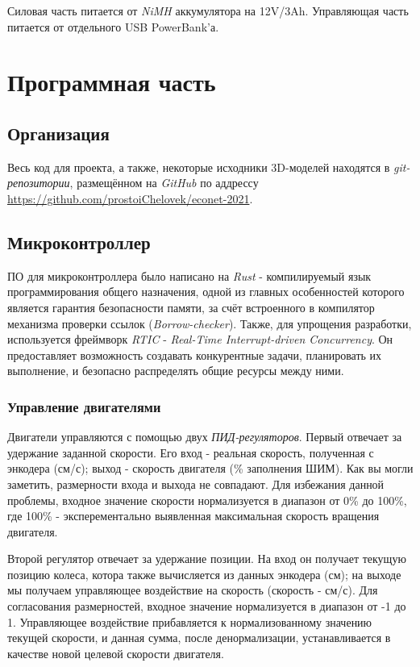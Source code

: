 \documentclass[11pt]{article}
\let\oldsection\section
\renewcommand\section{\pagebreak\oldsection}
\begin{document}
Силовая часть питается от \emph{NiMH} аккумулятора на 12V/3Ah. Управляющая часть питается от отдельного USB PowerBank'а.
\section{Программная часть}
\label{sec:org651214d}
\subsection{Организация}
\label{sec:org846646d}
Весь код для проекта, а также, некоторые исходники 3D-моделей находятся в \emph{git-репозитории}, размещённом на \emph{GitHub} по аддрессу \url{https://github.com/prostoiChelovek/econet-2021}.
\subsection{Микроконтроллер}
\label{sec:orgae6d461}
ПО для микроконтроллера было написано на \emph{Rust} - компилируемый язык программирования общего назначения, одной из главных особенностей которого является гарантия безопасности памяти, за счёт встроенного в компилятор механизма проверки ссылок (\emph{Borrow-checker}).
Также, для упрощения разработки, используется фреймворк \emph{RTIC} - \emph{Real-Time Interrupt-driven Concurrency}. Он предоставляет возможность создавать конкурентные задачи, планировать их выполнение, и безопасно распределять общие ресурсы между ними.
\subsubsection{Управление двигателями}
\label{sec:org96ac56b}
Двигатели управляются с помощью двух \emph{ПИД-регуляторов}. Первый отвечает за удержание заданной скорости. Его вход - реальная скорость, полученная с энкодера (см/с); выход - скорость двигателя (\% заполнения ШИМ). Как вы могли заметить, размерности входа и выхода не совпадают. Для избежания данной проблемы, входное значение скорости нормализуется в диапазон от 0\% до 100\%, где 100\% - эксперементально выявленная максимальная скорость вращения двигателя.

Второй регулятор отвечает за удержание позиции. На вход он получает текущую позицию колеса, котора также вычисляется из данных энкодера (см); на выходе мы получаем управляющее воздействие на скорость (скорость - см/с). Для согласования размерностей, входное значение нормализуется в диапазон от -1 до 1. Управляющее воздействие прибавляется к нормализованному значению текущей скорости, и данная сумма, после денормализации, устанавливается в качестве новой целевой скорости двигателя.
\end{document}
